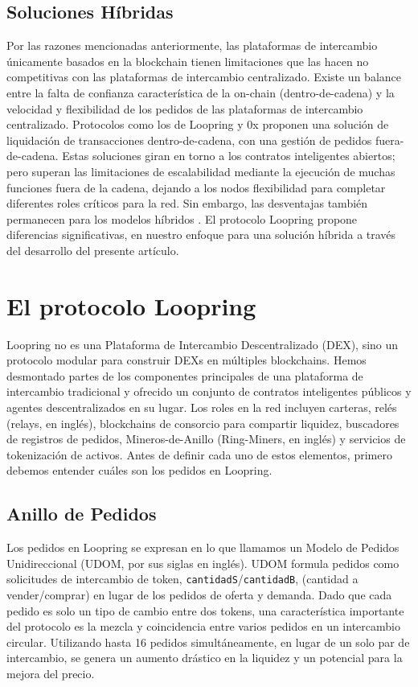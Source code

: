 \documentclass[UTF8,nofonts]{article}
\begin{document}
\begin{multicols}{2}
\subsection{Soluciones H\'ibridas}
Por las razones mencionadas anteriormente, las plataformas de intercambio \'unicamente basados en la blockchain tienen limitaciones que las hacen no competitivas con las plataformas de intercambio centralizado. Existe un balance entre la falta de confianza caracter\'istica de la on-chain (dentro-de-cadena) y la velocidad y flexibilidad de los pedidos de las plataformas de intercambio centralizado. Protocolos como los de Loopring y 0x \cite{warren20170x} proponen una soluci\'on de liquidaci\'on de transacciones dentro-de-cadena, con una gesti\'on de pedidos fuera-de-cadena. Estas soluciones giran en torno a los contratos inteligentes abiertos; pero superan las limitaciones de escalabilidad mediante la ejecuci\'on de muchas funciones fuera de la cadena, dejando a los nodos flexibilidad para completar diferentes roles cr\'iticos para la red. Sin embargo, las desventajas tambi\'en permanecen para los modelos h\'ibridos \cite{costofdecent}. El protocolo Loopring propone diferencias significativas, en nuestro enfoque para una soluci\'on h\'ibrida a trav\'es del desarrollo del presente art\'iculo.

\section{El protocolo Loopring\label{sec:loopring_protocol}}
Loopring no es una Plataforma de Intercambio Descentralizado (DEX), sino un protocolo modular para construir DEXs en m\'ultiples blockchains. Hemos desmontado partes de los componentes principales de una plataforma de intercambio tradicional y ofrecido un conjunto de contratos inteligentes p\'ublicos y agentes descentralizados en su lugar. Los roles en la red incluyen carteras, rel\'es (relays, en ingl\'es), blockchains de consorcio para compartir liquidez, buscadores de registros de pedidos, Mineros-de-Anillo (Ring-Miners, en ingl\'es) y servicios de tokenizaci\'on de activos. Antes de definir cada uno de estos elementos, primero debemos entender cu\'ales son los pedidos en Loopring.

\subsection{Anillo de Pedidos \label{sec:order_ring}}
Los pedidos en Loopring se expresan en lo que llamamos un Modelo de Pedidos Unidireccional (UDOM, por sus siglas en ingl\'es)\cite{coinport2014udom}. UDOM formula pedidos como solicitudes de intercambio de token, \verb|cantidadS|/\verb|cantidadB|, (cantidad a vender/comprar) en lugar de los pedidos de oferta y demanda. Dado que cada pedido es solo un tipo de cambio entre dos tokens, una caracter\'istica importante del protocolo es la mezcla y coincidencia entre varios pedidos en un intercambio circular. Utilizando hasta 16 pedidos simult\'aneamente, en lugar de un solo par de intercambio, se genera un aumento dr\'astico en la liquidez y un potencial para la mejora del precio.



\end{multicols}
\end{document}
